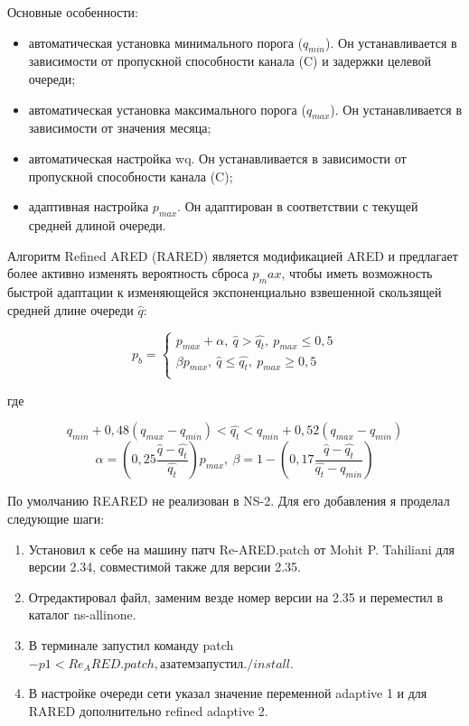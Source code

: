 Основные особенности: 
\begin{itemize}
\item автоматическая установка минимального порога ($q_{min}$). Он устанавливается в зависимости от пропускной способности канала (C) и задержки целевой очереди;
\item автоматическая установка максимального порога ($q_{max}$). Он устанавливается в зависимости от значения месяца;
\item автоматическая настройка wq. Он устанавливается в зависимости от пропускной способности канала (C);
\item адаптивная настройка $p_{max}$. Он адаптирован в соответствии с текущей средней длиной очереди.
\end{itemize}
Алгоритм Refined ARED (RARED) является модификацией ARED и предлагает более активно изменять вероятность сброса $p_max$, чтобы иметь возможность быстрой адаптации к изменяющейся экспоненциально взвешенной скользящей средней длине очереди $\hat{q}$:

$$
p_{b} = \left\{ \begin{array}{cl}
p_{max}+\alpha, \  \hat{q}>\hat{q_{t}}, \ p_{max} \leqslant0,5 \\
\beta p_{max}, \ \hat{q}\leqslant\hat{q_{t}}, \ p_{max} \geqslant0,5\\
\end{array} \right.
$$

где 

$$
q_{min}+0,48(q_{max}-q_{min}) < \hat{q_t} < q_{min}+0,52(q_{max}-q_{min})
$$
$$
\alpha=(0,25\frac{\hat{q}-\hat{q_t}}{\hat{q_t}})p_{max}, \ \beta=1-(0,17\frac{\hat{q}-\hat{q_t}}{\hat{q_t}-q_{min}})
$$


По умолчанию REARED не реализован в NS-2. Для его добавления я проделал следующие шаги:

\begin{enumerate}
\item Установил к себе на машину патч Re-ARED.patch от Mohit P. Tahiliani для версии 2.34, совместимой также для версии 2.35.
\item Отредактировал файл, заменим везде номер версии на 2.35 и переместил в каталог ns-allinone.
\item В терминале запустил команду patch $-p1 < Re_ARED.patch, а затем запустил ./install.$
\item В настройке очереди сети указал значение переменной adaptive 1 и для RARED дополнительно refined adaptive 2.
\end{enumerate}













